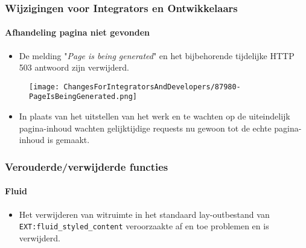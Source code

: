 
\begin{frame}[fragile]
	\frametitle{Wijzigingen voor Integrators en Ontwikkelaars}
	\framesubtitle{Afhandeling pagina niet gevonden}

	\begin{itemize}

		\item De melding "\textit{Page is being generated}" en het bijbehorende tijdelijke
			HTTP 503 antwoord zijn verwijderd.
	\end{itemize}

	\begin{figure}
		\texttt{[image: ChangesForIntegratorsAndDevelopers/87980-PageIsBeingGenerated.png]}
	\end{figure}

	\begin{itemize}
		\item In plaats van het uitstellen van het werk en te wachten op de uiteindelijk pagina-inhoud wachten
			gelijktijdige requests nu gewoon tot de echte pagina-inhoud is gemaakt.
	\end{itemize}

\end{frame}


\begin{frame}[fragile]
	\frametitle{Verouderde/verwijderde functies}
	\framesubtitle{Fluid}

	\begin{itemize}
		\item Het verwijderen van witruimte in het standaard lay-outbestand van \texttt{EXT:fluid\_styled\_content}
			veroorzaakte af en toe problemen en is verwijderd.

	\end{itemize}

\end{frame}


